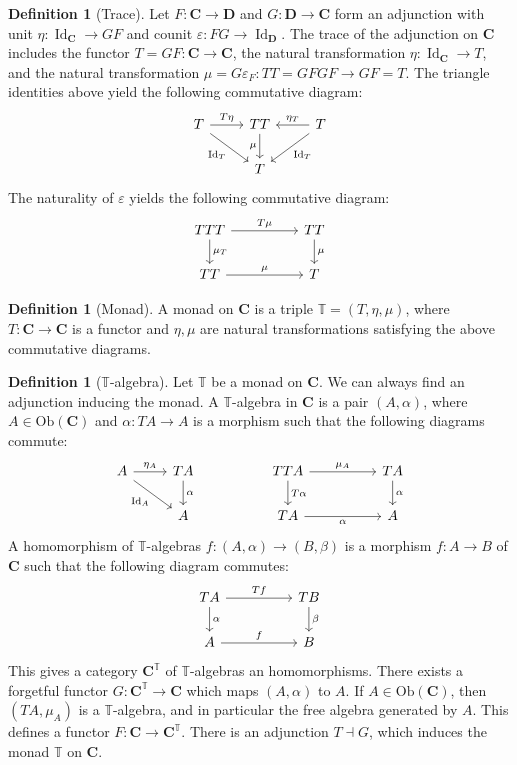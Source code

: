 \documentclass[reqno,dvipsnames]{amsart}
\let\bg\boldsymbol
\newcommand{\T}{\mathbb{T}}
\renewcommand{\a}{\alpha}
\renewcommand{\b}{\beta}
\renewcommand{\epsilon}{\varepsilon}
\newcommand{\e}{\epsilon}
\DeclareMathOperator*{\Id}{Id}                       %
\newcommand{\Ob}{\text{Ob}}
\theoremstyle{definition}
\newtheorem{definition}[theorem]{Definition}
\begin{document}
{\begin{definition}[Trace]
Let $F:\bg{C}\to\bg{D}$ and $G:\bg{D}\to\bg{C}$ form an adjunction with unit $\eta:\Id_{\bg{C}}\to GF$ and counit $\e:FG\to\Id_{\bg{D}}$. The trace of the adjunction on $\bg{C}$ includes the functor $T=GF:\bg{C}\to\bg{C}$, the natural transformation $\eta:\Id_{\bg{C}}\to T$, and the natural transformation $\mu=G\e_{F}:TT=GFGF\to GF=T$. The triangle identities above yield the following commutative diagram:
\[\begin{tikzcd}
	T & TT & T \\
	& T
	\arrow["T\eta", from=1-1, to=1-2]
	\arrow["{\eta_T}"', from=1-3, to=1-2]
	\arrow["\mu"', from=1-2, to=2-2]
	\arrow["{\Id_T}"', from=1-1, to=2-2]
	\arrow["{\Id_T}", from=1-3, to=2-2]
\end{tikzcd}\]
The naturality of $\e$ yields the following commutative diagram:
\[\begin{tikzcd}
	TTT && TT \\
	TT && T
	\arrow["T\mu", from=1-1, to=1-3]
	\arrow["\mu", from=2-1, to=2-3]
	\arrow["{\mu_T}", from=1-1, to=2-1]
	\arrow["\mu", from=1-3, to=2-3]
\end{tikzcd}\]
\end{definition}

\begin{definition}[Monad]
A monad on $\bg{C}$ is a triple $\T=(T,\eta,\mu)$, where $T:\bg{C}\to\bg{C}$ is a functor and $\eta,\mu$ are natural transformations satisfying the above commutative diagrams.
\end{definition}

\begin{definition}[$\T$-algebra]
Let $\T$ be a monad on $\bg{C}$. We can always find an adjunction inducing the monad. A $\T$-algebra in $\bg{C}$ is a pair $(A,\a)$, where $A\in\Ob(\bg{C})$ and $\a:TA\to A$ is a morphism such that the following diagrams commute:
\[\begin{tikzcd}
	A & TA && TTA && TA \\
	& A && TA && A
	\arrow["{\eta_A}", from=1-1, to=1-2]
	\arrow["\a", from=1-2, to=2-2]
	\arrow["{\Id_A}"', from=1-1, to=2-2]
	\arrow["T\a", from=1-4, to=2-4]
	\arrow["{\mu_A}", from=1-4, to=1-6]
	\arrow["\a"', from=2-4, to=2-6]
	\arrow["\a", from=1-6, to=2-6]
\end{tikzcd}\]
A homomorphism of $\T$-algebras $f:(A,\a)\to(B,\b)$ is a morphism $f:A\to B$ of $\bg{C}$ such that the following diagram commutes:
\[\begin{tikzcd}
	TA && TB \\
	A && B
	\arrow["Tf", from=1-1, to=1-3]
	\arrow["f", from=2-1, to=2-3]
	\arrow["\a", from=1-1, to=2-1]
	\arrow["\b", from=1-3, to=2-3]
\end{tikzcd}\]
This gives a category $\bg{C}^{\T}$ of $\T$-algebras an homomorphisms. There exists a forgetful functor $G:\bg{C}^\T\to\bg{C}$ which maps $(A,\a)$ to $A$. If $A\in\Ob(\bg{C})$, then $(TA,\mu_A)$ is a $\T$-algebra, and in particular the free algebra generated by $A$. This defines a functor $F:\bg{C}\to\bg{C}^{\T}$. There is an adjunction $T\dashv G$, which induces the monad $\T$ on $\bg{C}$.
\end{definition}

}
\end{document}
